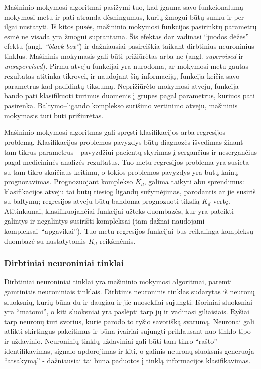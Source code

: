 Mašininio mokymosi algoritmai pasižymi tuo, kad įgauna savo funkcionalumą mokymosi metu ir pati atranda dėsningumus, kurių žmogui būtų sunku ir per ilgai nustatyti.\cite{stepniewska-dziubinska_development_2018} Iš kitos pusės, mašininio mokymosi funkcijos pasirinktų parametrų esmė ne visada yra žmogui suprantama. Šis efektas dar vadinasi \enquote{juodos dėžės} efektu (angl. \textit{\enquote{black box}}) ir dažniausiai pasireiškia taikant dirbtinius neuroninius tinklus.\cite{liu_classification_2015} Mašininis mokymasis gali būti prižiūrėtas arba ne (angl. \textit{supervised} ir \textit{unsupervised}). Pirmu atveju funkcijai yra nurodoma, ar mokymosi metu gautas rezultatas atitinka tikrovei, ir naudojant šią informaciją, funkcija keičia savo parametrus kad padidintų tikslumą. Neprižiūrėto mokymosi atveju, funkcija bando pati klasifikuoti turimus duomenis į grupes pagal parametrus, kuriuos pati pasirenka.\cite{schmidhuber_deep_2015} Baltymo--ligando komplekso surišimo vertinimo atveju, mašininis mokymasis turi būti prižiūrėtas.

Mašininio mokymosi algoritmas gali spręsti klasifikacijos arba regresijos problemą.\cite{lehr_playing_2017} Klasifikacijos problemos pavyzdys būtų diagnozės išvedimas žinant tam tikrus parametrus - pavyzdžiui pacientų skyrimas į sergančius ir nesergančius pagal medicininės analizės rezultatus. Tuo metu regresijos problema yra susieta su tam tikro skaičiaus keitimu, o tokios problemos pavyzdys yra butų kainų prognozavimas. Prognozuojant komplekso $K_{d}$, galima taikyti abu sprendimus: klasifikacijos atveju tai būtų tiesiog ligandų sužymėjimas, parodantis ar jie susiriš su baltymų; regresijos atveju būtų bandoma prognozuoti tikslią $K_{d}$ vertę. Atitinkamai, klasifikuojančiai funkcijai užteks duombazės, kur yra pateikti galintys ir negalintys susirišti kompleksai (tam dažnai naudojami kompleksai--\enquote{apgavikai}). Tuo metu regresijos funkcijai bus reikalinga kompleksų duombazė su nustatytomis $K_{d}$ reikšmėmis.

\subsubsection{Dirbtiniai neuroniniai tinklai}
\label{sec:neuroniniai_tinklai}

Dirbtiniai neuroniniai tinklai yra mašininio mokymosi algoritmai, paremti gamtiniais neuroniniais tinklais.\cite{ragoza_proteinligand_2017} Dirbtinis neuroninis tinklas sudarytas iš neuronų sluoksnių, kurių būna du ir daugiau ir jie nuosekliai sujungti. Išoriniai sluoksniai yra \enquote{matomi}, o kiti sluoksniai yra paslėpti tarp jų ir vadinasi giliaisiais.\cite{schmidhuber_deep_2015} Ryšiai tarp neuronų turi svorius, kurie parodo to ryšio savotišką svarumą. Neuronai gali atlikti skirtingus pakeitimus ir būna įvairiai sujungti priklausant nuo tinklo tipo ir uždavinio. Neuroninių tinklų uždaviniai gali būti tam tikro \enquote{rašto} identifikavimas, signalo apdorojimas ir kiti, o galinis neuronų sluoksnis generuoja \enquote{atsakymą} - dažniausiai tai būna paduotos į tinklą informacijos klasifikavimas.\cite{ragoza_proteinligand_2017}

